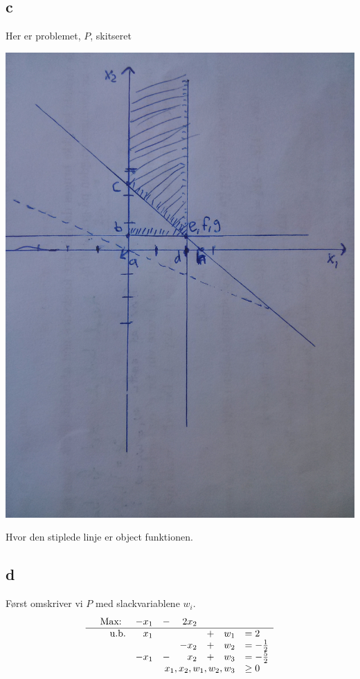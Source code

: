 \documentclass[a4paper]{article}
\begin{document}
\subsection*{c}
Her er problemet, $P$, skitseret
\begin{center}
\includegraphics[scale=0.1]{img1}
\end{center}
Hvor den stiplede linje er object funktionen.

\subsection*{d}
Først omskriver vi $P$ med slackvariablene $w_i$.
\begin{equation}
\begin{array}{rrrrrrrl}
&\text{Max: } & -x_1 &- &2x_2 & \\
\hline
&\text{u.b.} &x_1 & & & + &w_1&= 2 \\
& & & &-x_2 &+ &w_2 &= -\frac{1}{2} \\
& &-x_1 &- &x_2 &+ &w_3 &= -\frac{5}{2} \\
& & &\multicolumn{4}{r} {x_1,x_2,w_1,w_2,w_3} &\geq 0
\end{array}
\end{equation}
\end{document}
